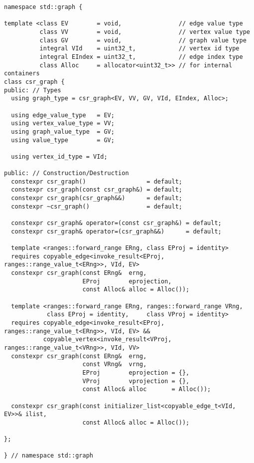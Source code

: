 \documentclass[10pt,onecolumn]{article}
\begin{document}
\begin{lstlisting}
namespace std::graph {

template <class EV        = void,                // edge value type
          class VV        = void,                // vertex value type
          class GV        = void,                // graph value type
          integral VId    = uint32_t,            // vertex id type
          integral EIndex = uint32_t,            // edge index type
          class Alloc     = allocator<uint32_t>> // for internal containers
class csr_graph {
public: // Types
  using graph_type = csr_graph<EV, VV, GV, VId, EIndex, Alloc>;
  
  using edge_value_type   = EV;
  using vertex_value_type = VV;
  using graph_value_type  = GV;
  using value_type        = GV;

  using vertex_id_type = VId;

public: // Construction/Destruction
  constexpr csr_graph()                 = default;
  constexpr csr_graph(const csr_graph&) = default;
  constexpr csr_graph(csr_graph&&)      = default;
  constexpr ~csr_graph()                = default;

  constexpr csr_graph& operator=(const csr_graph&) = default;
  constexpr csr_graph& operator=(csr_graph&&)      = default;

  template <ranges::forward_range ERng, class EProj = identity>
  requires copyable_edge<invoke_result<EProj, ranges::range_value_t<ERng>>, VId, EV>
  constexpr csr_graph(const ERng&  erng, 
                      EProj        eprojection, 
                      const Alloc& alloc = Alloc());

  template <ranges::forward_range ERng, ranges::forward_range VRng,
            class EProj = identity,     class VProj = identity>
  requires copyable_edge<invoke_result<EProj, ranges::range_value_t<ERng>>, VId, EV> &&
           copyable_vertex<invoke_result<VProj, ranges::range_value_t<VRng>>, VId, VV>
  constexpr csr_graph(const ERng&  erng,
                      const VRng&  vrng,
                      EProj        eprojection = {},
                      VProj        vprojection = {},
                      const Alloc& alloc       = Alloc());

  constexpr csr_graph(const initializer_list<copyable_edge_t<VId, EV>>& ilist, 
                      const Alloc& alloc = Alloc());

};

} // namespace std::graph
\end{lstlisting}
\end{document}
